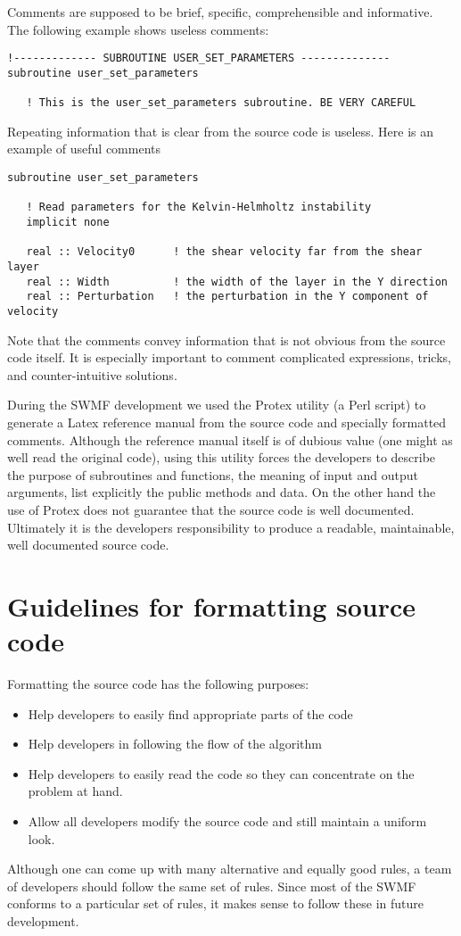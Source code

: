 \documentclass{article}
\begin{document}
Comments are supposed to be brief, specific, comprehensible and informative. 
The following example shows useless comments:
\begin{verbatim}
!------------- SUBROUTINE USER_SET_PARAMETERS --------------
subroutine user_set_parameters

   ! This is the user_set_parameters subroutine. BE VERY CAREFUL
\end{verbatim}
Repeating information that is clear from the source code is useless. Here is
an example of useful comments
\begin{verbatim}
subroutine user_set_parameters

   ! Read parameters for the Kelvin-Helmholtz instability
   implicit none

   real :: Velocity0      ! the shear velocity far from the shear layer
   real :: Width          ! the width of the layer in the Y direction
   real :: Perturbation   ! the perturbation in the Y component of velocity

\end{verbatim}
Note that the comments convey information that is not obvious from the 
source code itself. It is especially important to comment complicated
expressions, tricks, and counter-intuitive solutions. 

During the SWMF development we used the Protex utility (a Perl script) 
to generate a Latex reference manual from the source code and 
specially formatted comments. Although the reference manual itself is of 
dubious value (one might as well read the original code), 
using this utility forces the developers to describe the purpose of 
subroutines and functions, the meaning of input and output arguments, 
list explicitly the public methods and data. On the other hand the use of
Protex does not guarantee that the source code is well documented. 
Ultimately it is the developers responsibility to produce a readable, 
maintainable, well documented source code.

\section{Guidelines for formatting source code}

Formatting the source code has the following purposes:
\begin{itemize}
\item Help developers to easily find appropriate parts of the code
\item Help developers in following the flow of the algorithm
\item Help developers to easily read the code so they can concentrate
      on the problem at hand.
\item Allow all developers modify the source code and still maintain 
      a uniform look.
\end{itemize}
Although one can come up with many alternative and equally good rules, 
a team of developers should follow the same set of rules. Since most of 
the SWMF conforms to a particular set of rules, it makes sense to follow
these in future development. 
\end{document}
